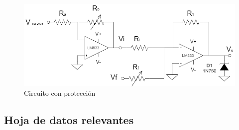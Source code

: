 \begin{figure}[H]
    \centering
    \includegraphics[scale=0.5]{../Ejercicio4-CircuitodeAplicacion/CircProteccion.png}
    \caption{Circuito con protección}
\end{figure}


\subsection{Hoja de datos relevantes}





